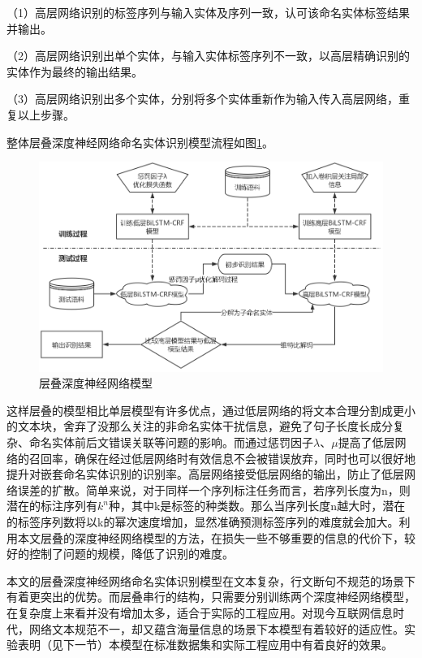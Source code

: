 \documentclass[winfonts,master,oneside,nobackinfo]{njuthesis}
\begin{document}
（1）高层网络识别的标签序列与输入实体及序列一致，认可该命名实体标签结果并输出。

（2）高层网络识别出单个实体，与输入实体标签序列不一致，以高层精确识别的实体作为最终的输出结果。

（3）高层网络识别出多个实体，分别将多个实体重新作为输入传入高层网络，重复以上步骤。

整体层叠深度神经网络命名实体识别模型流程如图\ref{high-low}。

\begin{figure}[h]
\centering
\includegraphics[width=1\textwidth]{./figure/层叠模型流程.jpg}
\caption{层叠深度神经网络模型}
\label{high-low}
\end{figure}

这样层叠的模型相比单层模型有许多优点，通过低层网络的将文本合理分割成更小的文本块，舍弃了没那么关注的非命名实体干扰信息，避免了句子长度长成分复杂、命名实体前后文错误关联等问题的影响。而通过惩罚因子$\lambda$、$\mu$提高了低层网络的召回率，确保在经过低层网络时有效信息不会被错误放弃，同时也可以很好地提升对嵌套命名实体识别的识别率。高层网络接受低层网络的输出，防止了低层网络误差的扩散。简单来说，对于同样一个序列标注任务而言，若序列长度为n，则潜在的标注序列有$k^n$种，其中k是标签的种类数。那么当序列长度n越大时，潜在的标签序列数将以k的幂次速度增加，显然准确预测标签序列的难度就会加大。利用本文层叠的深度神经网络模型的方法，在损失一些不够重要的信息的代价下，较好的控制了问题的规模，降低了识别的难度。

本文的层叠深度神经网络命名实体识别模型在文本复杂，行文断句不规范的场景下有着更突出的优势。而层叠串行的结构，只需要分别训练两个深度神经网络模型，在复杂度上来看并没有增加太多，适合于实际的工程应用。对现今互联网信息时代，网络文本规范不一，却又蕴含海量信息的场景下本模型有着较好的适应性。实验表明（见下一节）本模型在标准数据集和实际工程应用中有着良好的效果。
\end{document}
